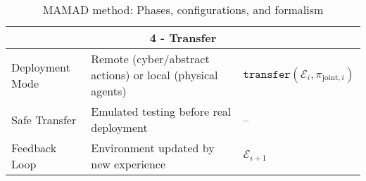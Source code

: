 \begin{table}[h!]
\begin{footnotesize}
\begin{tabular}{|p{3cm}|p{6cm}|p{3cm}|}
            \multicolumn{3}{|c|}{\textbf{4 - Transfer}}                                                                                                                                                                                                                                    \\ \hline
            Deployment Mode               & Remote (cyber/abstract actions) or local (physical agents)                     & $\texttt{transfer}(\mathcal{E}_i, \pi_{\text{joint}, i})$                                                                                                     \\ \hline
            Safe Transfer                 & Emulated testing before real deployment                                        & --                                                                                                                                                            \\ \hline
            Feedback Loop                 & Environment updated by new experience                                          & $\mathcal{E}_{i+1}$                                                                                                                                           \\ \hline
        \end{tabular}
        \caption{MAMAD method: Phases, configurations, and formalism}
        \label{tab:mamad_table_configuration}
    \end{footnotesize}
\end{table}
